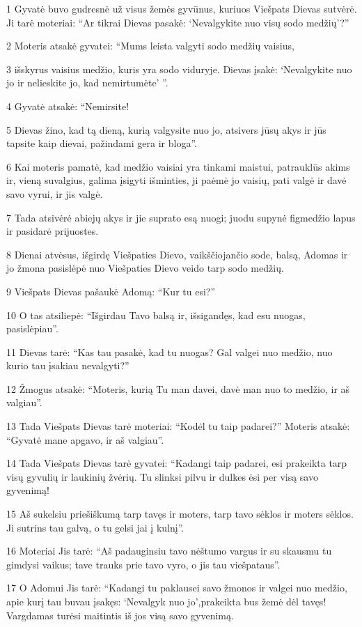 \par 1 Gyvatė buvo gudresnė už visus žemės gyvūnus, kuriuos Viešpats Dievas sutvėrė. Ji tarė moteriai: “Ar tikrai Dievas pasakė: ‘Nevalgykite nuo visų sodo medžių’?” 
\par 2 Moteris atsakė gyvatei: “Mums leista valgyti sodo medžių vaisius, 
\par 3 išskyrus vaisius medžio, kuris yra sodo viduryje. Dievas įsakė: ‘Nevalgykite nuo jo ir nelieskite jo, kad nemirtumėte’ ”. 
\par 4 Gyvatė atsakė: “Nemirsite! 
\par 5 Dievas žino, kad tą dieną, kurią valgysite nuo jo, atsivers jūsų akys ir jūs tapsite kaip dievai, pažindami gera ir bloga”. 
\par 6 Kai moteris pamatė, kad medžio vaisiai yra tinkami maistui, patrauklūs akims ir, vieną suvalgius, galima įsigyti išminties, ji paėmė jo vaisių, pati valgė ir davė savo vyrui, ir jis valgė. 
\par 7 Tada atsivėrė abiejų akys ir jie suprato esą nuogi; juodu supynė figmedžio lapus ir pasidarė prijuostes. 
\par 8 Dienai atvėsus, išgirdę Viešpaties Dievo, vaikščiojančio sode, balsą, Adomas ir jo žmona pasislėpė nuo Viešpaties Dievo veido tarp sodo medžių. 
\par 9 Viešpats Dievas pašaukė Adomą: “Kur tu esi?” 
\par 10 O tas atsiliepė: “Išgirdau Tavo balsą ir, išsigandęs, kad esu nuogas, pasislėpiau”. 
\par 11 Dievas tarė: “Kas tau pasakė, kad tu nuogas? Gal valgei nuo medžio, nuo kurio tau įsakiau nevalgyti?” 
\par 12 Žmogus atsakė: “Moteris, kurią Tu man davei, davė man nuo to medžio, ir aš valgiau”. 
\par 13 Tada Viešpats Dievas tarė moteriai: “Kodėl tu taip padarei?” Moteris atsakė: “Gyvatė mane apgavo, ir aš valgiau”. 
\par 14 Tada Viešpats Dievas tarė gyvatei: “Kadangi taip padarei, esi prakeikta tarp visų gyvulių ir laukinių žvėrių. Tu slinksi pilvu ir dulkes ėsi per visą savo gyvenimą! 
\par 15 Aš sukelsiu priešiškumą tarp tavęs ir moters, tarp tavo sėklos ir moters sėklos. Ji sutrins tau galvą, o tu gelsi jai į kulnį”. 
\par 16 Moteriai Jis tarė: “Aš padauginsiu tavo nėštumo vargus ir su skausmu tu gimdysi vaikus; tave trauks prie tavo vyro, o jis tau viešpataus”. 
\par 17 O Adomui Jis tarė: “Kadangi tu paklausei savo žmonos ir valgei nuo medžio, apie kurį tau buvau įsakęs: ‘Nevalgyk nuo jo’,­prakeikta bus žemė dėl tavęs! Vargdamas turėsi maitintis iš jos visą savo gyvenimą. 
